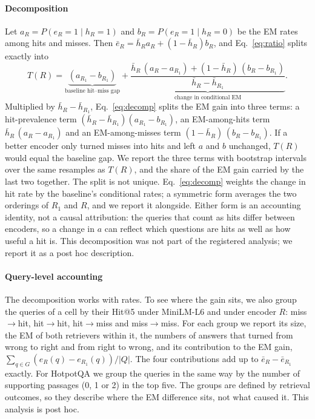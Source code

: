 \paragraph{Decomposition}
Let $a_R=P(e_R=1\mid h_R=1)$ and $b_R=P(e_R=1\mid h_R=0)$ be the EM rates among hits and misses. Then $\bar e_R=\bar h_R a_R+(1-\bar h_R)b_R$, and Eq.~\ref{eq:ratio} splits exactly into
\begin{equation}
T(R) = \underbrace{(a_{R_1}-b_{R_1})}_{\text{baseline hit--miss gap}} + \underbrace{\frac{\bar h_R\,(a_R-a_{R_1}) + (1-\bar h_R)\,(b_R-b_{R_1})}{\bar h_R-\bar h_{R_1}}}_{\text{change in conditional EM}}.
\label{eq:decomp}
\end{equation}
Multiplied by $\bar h_R-\bar h_{R_1}$, Eq.~\ref{eq:decomp} splits the EM gain into three terms: a hit-prevalence term $(\bar h_R-\bar h_{R_1})(a_{R_1}-b_{R_1})$, an EM-among-hits term $\bar h_R\,(a_R-a_{R_1})$ and an EM-among-misses term $(1-\bar h_R)\,(b_R-b_{R_1})$. If a better encoder only turned misses into hits and left $a$ and $b$ unchanged, $T(R)$ would equal the baseline gap. We report the three terms with bootstrap intervals over the same resamples as $T(R)$, and the share of the EM gain carried by the last two together. The split is not unique. Eq.~\ref{eq:decomp} weights the change in hit rate by the baseline's conditional rates; a symmetric form averages the two orderings of $R_1$ and $R$, and we report it alongside. Either form is an accounting identity, not a causal attribution: the queries that count as hits differ between encoders, so a change in $a$ can reflect which questions are hits as well as how useful a hit is. This decomposition was not part of the registered analysis; we report it as a post hoc description.

\paragraph{Query-level accounting}
The decomposition works with rates. To see where the gain sits, we also group the queries of a cell by their Hit@5 under MiniLM-L6 and under encoder $R$: miss$\to$hit, hit$\to$hit, hit$\to$miss and miss$\to$miss. For each group we report its size, the EM of both retrievers within it, the numbers of answers that turned from wrong to right and from right to wrong, and its contribution to the EM gain, $\sum_{q\in G}(e_R(q)-e_{R_1}(q))/|Q|$. The four contributions add up to $\bar e_R-\bar e_{R_1}$ exactly. For HotpotQA we group the queries in the same way by the number of supporting passages (0, 1 or 2) in the top five. The groups are defined by retrieval outcomes, so they describe where the EM difference sits, not what caused it. This analysis is post hoc.

